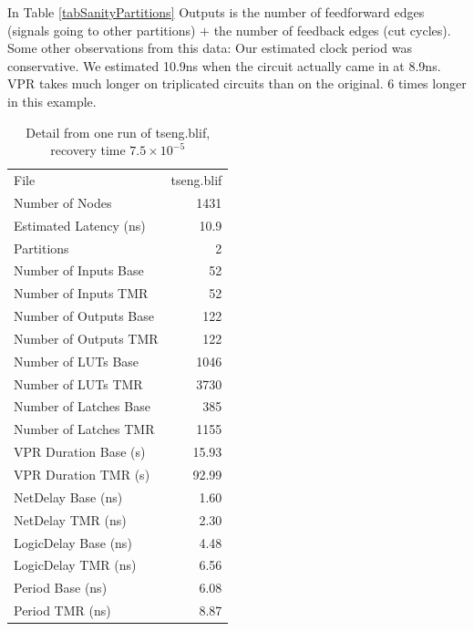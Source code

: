 \documentclass[12pt,final,oneside]{dwThesis} %
\begin{document}
    In Table \ref{tabSanityPartitions}
   Outputs is the number of feedforward edges (signals going to other
   partitions) $+$ the number of feedback edges (cut cycles). Some other observations
   from this data: Our estimated clock period was conservative. We estimated
   10.9ns when the circuit actually came in at 8.9ns.  \gls{VPR} takes much
   longer on triplicated circuits than on the original. 6 times longer in this
   example.  
   \begin{table}
      \begin{center}

      \begin{tabular}
         {lr} \toprule File & tseng.blif\\

         Number of Nodes & 1431\\
         Estimated Latency (ns)& 10.9\\
         Partitions &
         2\\
         Number of Inputs Base & 52\\
         Number of Inputs TMR & 52\\
         Number of
         Outputs Base & 122\\
         Number of Outputs TMR & 122\\
         Number of LUTs Base
         & 1046\\
         Number of LUTs TMR & 3730\\
         Number of Latches Base & 385\\

         Number of Latches TMR & 1155\\
         VPR Duration Base (s) & 15.93\\
         VPR
         Duration TMR (s) & 92.99\\
         NetDelay Base (ns) & 1.60\\
         NetDelay TMR
         (ns) & 2.30\\
         LogicDelay Base (ns) & 4.48\\
         LogicDelay TMR (ns) &
         6.56\\
         Period Base (ns) & 6.08\\
         Period TMR (ns) & 8.87\\
         \bottomrule

      \end{tabular}
      \caption{Detail from one run of tseng.blif, recovery time
         $7.5\times10^{-5}$}\label{tabSanity} 
   \end{center}\end{table}
\end{document}
